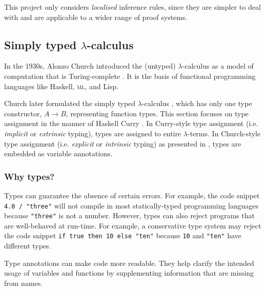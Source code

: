 This project only considers \textit{localised} inference rules, since they are simpler to deal with and are applicable to a wider range of proof systems.

\subsection{Simply typed \texorpdfstring{$\lambda$-calculus}{Lambda Calculus}}
In the 1930s, Alonzo Church introduced the (untyped) $\lambda$-calculus \cite{church:1936} as a model of computation that is Turing-complete \cite{turing:1937}. It is the basis of functional programming languages like Haskell, \textsc{ml}, and Lisp.

Church later formulated the simply typed $\lambda$-calculus \cite{church:1940}, which has only one type constructor, $A \to B$, representing function types. This section focuses on type assignment in the manner of Haskell Curry \cite{curry:1934}. In Curry-style type assignment (i.e. \textit{implicit} or \textit{extrinsic} typing), types are assigned to entire $\lambda$-terms. In Church-style type assignment (i.e. \textit{explicit} or \textit{intrinsic} typing) as presented in \cite{church:1940}, types are embedded as variable annotations.

\subsubsection{Why types?}
Types can guarantee the absence of certain errors. For example, the code snippet \lstinline{4.0 / "three"} will not compile in most statically-typed programming languages because \lstinline{"three"} is not a number. However, types can also reject programs that are well-behaved at run-time. For example, a conservative type system may reject the code snippet \lstinline{if true then 10 else "ten"} because \lstinline{10} and \lstinline{"ten"} have different types.

Type annotations can make code more readable. They help clarify the intended usage of variables and functions by supplementing information that are missing from names.

